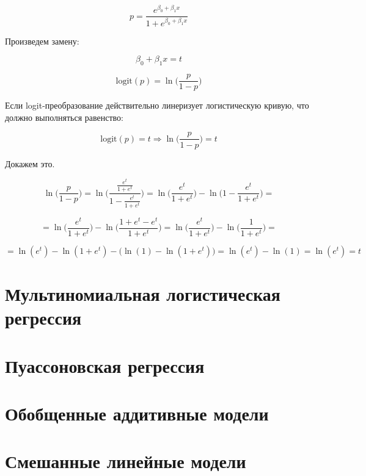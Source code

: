 \documentclass[
  letterpaper,
  DIV=11,
  numbers=noendperiod]{scrreprt}
\theoremstyle{definition}
\theoremstyle{remark}
\begin{document}
\[
p = \frac{e^{\beta_0 + \beta_1 x}}{1 + e^{\beta_0 + \beta_1 x}}
\]

Произведем замену:

\[
\beta_0 + \beta_1 x = t
\]

\[
\mathrm{logit}(p) = \ln \Big( \frac{p}{1-p} \Big)
\]

Если logit-преобразование действительно линеризует логистическую кривую,
что должно выполняться равенство:

\[
\mathrm{logit}(p) = t \Rightarrow \ln \Big( \frac{p}{1-p} \Big) = t
\]

Докажем это.

\[
\ln \Big( \frac{p}{1-p} \Big) = 
\ln \Bigg( \frac{\frac{e^t}{1 + e^t}}{1 - \frac{e^t}{1 + e^t}} \Bigg) =
\ln \Big( \frac{e^t}{1 + e^t} \Big) - \ln \Big(1 - \frac{e^t}{1 + e^t} \Big) = 
\]

\[
= \ln \Big( \frac{e^t}{1 + e^t} \Big) - \ln \Big(\frac{1 + e^t - e^t}{1 + e^t} \Big) = 
\ln \Big( \frac{e^t}{1 + e^t} \Big) - \ln \Big( \frac{1}{1 + e^t} \Big) = 
\]

\[
= \ln (e^t) - \ln (1 + e^t) - \big(\ln (1) - \ln (1+e^t)\big) = 
\ln (e^t) - \ln (1) = 
\ln (e^t) = t
\]


\chapter{Мультиномиальная логистическая
регрессия}\label{andan-multinomlogreg}


\chapter{Пуассоновская регрессия}\label{andan-poissonreg}


\chapter{Обобщенные аддитивные модели}\label{andan-gam}


\chapter{Смешанные линейные модели}\label{andan-glmm}

\end{document}
